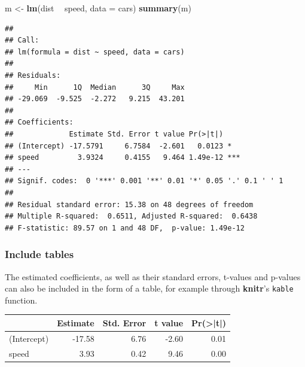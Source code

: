 \documentclass[]{book}
\newenvironment{Shaded}{\begin{snugshade}}{\end{snugshade}}
\newcommand{\DataTypeTok}[1]{\textcolor[rgb]{0.13,0.29,0.53}{#1}}
\newcommand{\DecValTok}[1]{\textcolor[rgb]{0.00,0.00,0.81}{#1}}
\newcommand{\KeywordTok}[1]{\textcolor[rgb]{0.13,0.29,0.53}{\textbf{#1}}}
\newcommand{\NormalTok}[1]{#1}
\newcommand{\OperatorTok}[1]{\textcolor[rgb]{0.81,0.36,0.00}{\textbf{#1}}}
\newcommand{\StringTok}[1]{\textcolor[rgb]{0.31,0.60,0.02}{#1}}
\begin{document}
\begin{Shaded}
\begin{Highlighting}[]
\NormalTok{m <-}\StringTok{ }\KeywordTok{lm}\NormalTok{(dist }\OperatorTok{~}\StringTok{ }\NormalTok{speed, }\DataTypeTok{data =}\NormalTok{ cars)}
\KeywordTok{summary}\NormalTok{(m)}
\end{Highlighting}
\end{Shaded}

\begin{verbatim}
## 
## Call:
## lm(formula = dist ~ speed, data = cars)
## 
## Residuals:
##     Min      1Q  Median      3Q     Max 
## -29.069  -9.525  -2.272   9.215  43.201 
## 
## Coefficients:
##             Estimate Std. Error t value Pr(>|t|)    
## (Intercept) -17.5791     6.7584  -2.601   0.0123 *  
## speed         3.9324     0.4155   9.464 1.49e-12 ***
## ---
## Signif. codes:  0 '***' 0.001 '**' 0.01 '*' 0.05 '.' 0.1 ' ' 1
## 
## Residual standard error: 15.38 on 48 degrees of freedom
## Multiple R-squared:  0.6511,	Adjusted R-squared:  0.6438 
## F-statistic: 89.57 on 1 and 48 DF,  p-value: 1.49e-12
\end{verbatim}

\hypertarget{include-tables}{%
\subsubsection{Include tables}\label{include-tables}}

The estimated coefficients, as well as their standard errors, t-values and p-values can also be included in the form of a table, for example through \textbf{knitr}'s \texttt{kable} function.

\begin{Shaded}
\end{Shaded}

\begin{tabular}{l|r|r|r|r}
\hline
  & Estimate & Std. Error & t value & Pr(>|t|)\\
\hline
(Intercept) & -17.58 & 6.76 & -2.60 & 0.01\\
\hline
speed & 3.93 & 0.42 & 9.46 & 0.00\\
\hline
\end{tabular}
\end{document}

